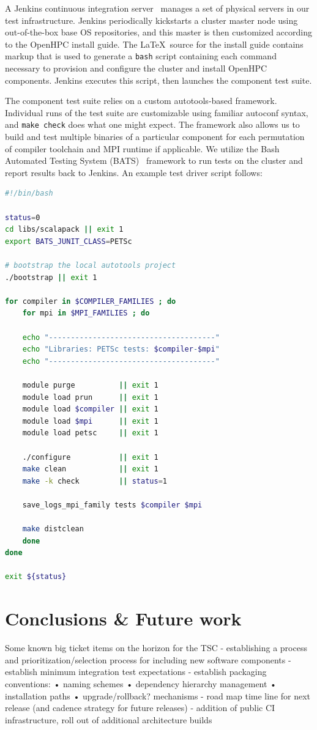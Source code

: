 \documentclass{sig-alternate-05-2015}
\begin{document}
A Jenkins continuous integration server~\cite{jenkins_url} manages a set of 
physical servers in our test infrastructure. Jenkins periodically kickstarts a cluster 
master node using out-of-the-box base OS repositories, and this master is then 
customized according to the OpenHPC install guide. The \LaTeX\ source for the 
install guide contains markup that is used to generate a \texttt{{bash}} script 
containing each command necessary to provision and configure the cluster and install OpenHPC
components. Jenkins executes this script, then launches the component test suite.

The component test suite relies on a custom autotools-based framework.
Individual runs of the test suite are customizable using familiar autoconf
syntax, and \texttt{{make check}} does what one might expect. The framework also
allows us to build and test multiple binaries of a 
particular component for each permutation of compiler toolchain and MPI runtime if applicable.
We utilize the Bash Automated Testing System (BATS)~\cite{bats_url} 
framework to run tests on the cluster and report results back to Jenkins. An
example test driver script follows:

\begin{lstlisting}[language=bash,keywords={}]
#!/bin/bash

status=0
cd libs/scalapack || exit 1
export BATS_JUNIT_CLASS=PETSc

# bootstrap the local autotools project 
./bootstrap || exit 1

for compiler in $COMPILER_FAMILIES ; do
    for mpi in $MPI_FAMILIES ; do

    echo "--------------------------------------"
    echo "Libraries: PETSc tests: $compiler-$mpi"
    echo "--------------------------------------"

    module purge          || exit 1
    module load prun      || exit 1
    module load $compiler || exit 1
    module load $mpi      || exit 1
    module load petsc     || exit 1

    ./configure           || exit 1
    make clean            || exit 1
    make -k check         || status=1

    save_logs_mpi_family tests $compiler $mpi

    make distclean
    done
done

exit ${status}
\end{lstlisting}


\section{Conclusions \& Future work}
Some known big ticket items on the horizon for the TSC
- establishing a process and prioritization/selection process for including
new software components
- establish minimum integration test expectations
- establish packaging conventions:
• naming schemes
• dependency hierarchy management • installation paths
• upgrade/rollback? mechanisms
- road map time line for next release (and cadence strategy for future releases)
- addition of public CI infrastructure, roll out of additional architecture builds




\end{document}
